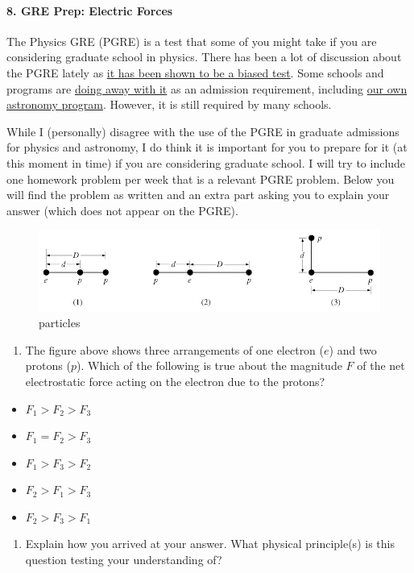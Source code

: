 \documentclass[
  letterpaperpaper,
]{article}
\providecommand{\tightlist}{%
  \setlength{\itemsep}{0pt}\setlength{\parskip}{0pt}}
\begin{document}
\hypertarget{gre-prep-electric-forces}{%
\paragraph{8. GRE Prep: Electric
Forces}\label{gre-prep-electric-forces}}

The Physics GRE (PGRE) is a test that some of you might take if you are
considering graduate school in physics. There has been a lot of
discussion about the PGRE lately as
\href{https://advances.sciencemag.org/content/5/1/eaat7550}{it has been
shown to be a biased test}. Some schools and programs are
\href{https://aas.org/posts/news/2015/12/presidents-column-rethinking-role-gre}{doing
away with it} as an admission requirement, including
\href{https://astro.natsci.msu.edu/graduate/how-to-apply/}{our own
astronomy program}. However, it is still required by many schools.

While I (personally) disagree with the use of the PGRE in graduate
admissions for physics and astronomy, I do think it is important for you
to prepare for it (at this moment in time) if you are considering
graduate school. I will try to include one homework problem per week
that is a relevant PGRE problem. Below you will find the problem as
written and an extra part asking you to explain your answer (which does
not appear on the PGRE).

\begin{figure}
\centering
\includegraphics{./images/hw1/01-pgre.png}
\caption{particles}
\end{figure}

\begin{enumerate}
\def\labelenumi{\arabic{enumi}.}
\tightlist
\item
  The figure above shows three arrangements of one electron (\(e\)) and
  two protons (\(p\)). Which of the following is true about the
  magnitude \(F\) of the net electrostatic force acting on the electron
  due to the protons?
\end{enumerate}

\begin{itemize}
\tightlist
\item
  \(F_1 > F_2 > F_3\)
\item
  \(F_1 = F_2 > F_3\)
\item
  \(F_1 > F_3 > F_2\)
\item
  \(F_2 > F_1 > F_3\)
\item
  \(F_2 > F_3 > F_1\)
\end{itemize}

\begin{enumerate}
\def\labelenumi{\arabic{enumi}.}
\setcounter{enumi}{1}
\tightlist
\item
  Explain how you arrived at your answer. What physical principle(s) is
  this question testing your understanding of?
\end{enumerate}
\end{document}
